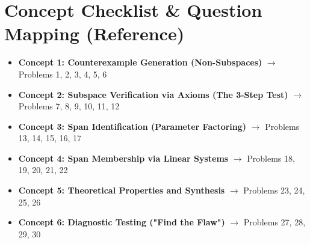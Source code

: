 \documentclass[11pt]{article}
\begin{document}
\section*{Concept Checklist \& Question Mapping (Reference)}
\begin{itemize}
    \item \textbf{Concept 1: Counterexample Generation (Non-Subspaces)} $\rightarrow$ Problems 1, 2, 3, 4, 5, 6
    \item \textbf{Concept 2: Subspace Verification via Axioms (The 3-Step Test)} $\rightarrow$ Problems 7, 8, 9, 10, 11, 12
    \item \textbf{Concept 3: Span Identification (Parameter Factoring)} $\rightarrow$ Problems 13, 14, 15, 16, 17
    \item \textbf{Concept 4: Span Membership via Linear Systems} $\rightarrow$ Problems 18, 19, 20, 21, 22
    \item \textbf{Concept 5: Theoretical Properties and Synthesis} $\rightarrow$ Problems 23, 24, 25, 26
    \item \textbf{Concept 6: Diagnostic Testing ("Find the Flaw")} $\rightarrow$ Problems 27, 28, 29, 30
\end{itemize}
\end{document}
